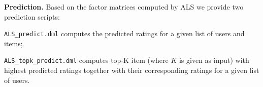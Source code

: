  
 \textbf{Prediction.} 
 Based on the factor matrices computed by ALS we provide two prediction scripts:   
 \begin{Enumerate}
 	\item {\tt ALS\_predict.dml} computes the predicted ratings for a given list of users and items;
 	\item {\tt ALS\_topk\_predict.dml} computes top-K item (where $K$ is given as input) with highest predicted ratings together with their corresponding ratings for a given list of users.
 \end{Enumerate} 
  
 \smallskip
 \smallskip
 
